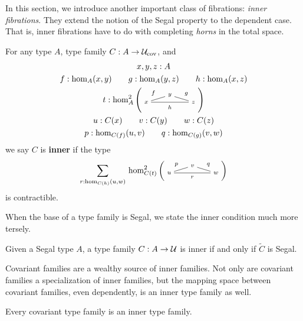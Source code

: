 \documentclass[main.tex]{subfiles}
\begin{document}
In this section, we introduce another important class of fibrations: \textit{inner fibrations}. They extend the notion of the Segal property to the dependent case. That is, inner fibrations have to do with completing \textit{horns} in the total space.

\begin{definition}
    For any type $A$, type family $C : A \to \mathcal{U}_\text{cov}$, and
    \begin{gather*}
    x,y,z : A  \\
    f : \ho[A]{x}{y} \qquad g : \ho[A]{y}{z} \qquad h:\ho[A]{x}{z} \\
    t : \homtwo{A}(x,y,z,f,g,h)\\
    u : C(x) \qquad v : C(y) \qquad w : C(z) \\
    p : \dho{C}{f}{u}{v} \qquad q : \dho{C}{g}{v}{w}  
    \end{gather*}
    we say $C$ is \textbf{inner} if the type 
    \begin{equation}
        \sm{r : \dho{C}{h}{u}{w}}\homtwo{C(t)}(u,v,w,p,q,r)
    \end{equation}
    is contractible.
\end{definition}

When the base of a type family is Segal, we state the inner condition much more tersely.
\begin{lemma}[BW23]
    \label{lem:totbaseseginner}
    Given a Segal type $A$, a type family $C : A \to \mathcal{U}$ is inner if and only if $\widetilde{C}$ is Segal.
\end{lemma}
Covariant families are a wealthy source of inner families. Not only are covariant families a specialization of inner families, but the mapping space between covariant families, even dependently, is an inner type family as well. 

\begin{lemma}[BW21]
    Every covariant type family is an inner type family.
\end{lemma}
\end{document}
